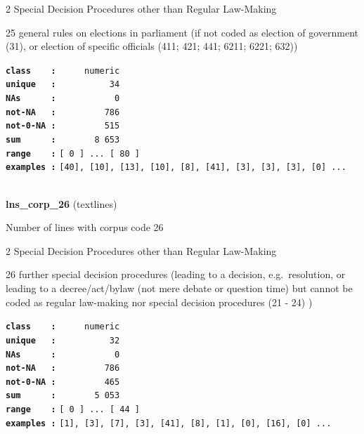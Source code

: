 \documentclass[]{article}
\begin{document}
2 Special Decision Procedures other than Regular Law-Making

25 general rules on elections in parliament (if not coded as election of
government (31), or election of specific officials (411; 421; 441; 6211;
6221; 632))

\textbf{\texttt{class\ \ \ \ :}} \texttt{~~~~~numeric}\\
\textbf{\texttt{unique\ \ \ :}} \texttt{~~~~~~~~~~34}\\
\textbf{\texttt{NAs\ \ \ \ \ \ :}} \texttt{~~~~~~~~~~~0}\\
\textbf{\texttt{not-NA\ \ \ :}} \texttt{~~~~~~~~~786}\\
\textbf{\texttt{not-0-NA\ :}} \texttt{~~~~~~~~~515}\\
\textbf{\texttt{sum\ \ \ \ \ \ :}} \texttt{~~~~~~~8~653}\\
\textbf{\texttt{range\ \ \ \ :}}
\texttt{{[}\ 0\ {]}\ ...\ {[}\ 80\ {]}}\\
\textbf{\texttt{examples\ :}}
\texttt{{[}40{]},\ {[}10{]},\ {[}13{]},\ {[}10{]},\ {[}8{]},\ {[}41{]},\ {[}3{]},\ {[}3{]},\ {[}3{]},\ {[}0{]}\ ...}\\

~

\textbf{lns\_corp\_26} (textlines)

Number of lines with corpus code 26

2 Special Decision Procedures other than Regular Law-Making

26 further special decision procedures (leading to a decision,
e.g.~resolution, or leading to a decree/act/bylaw (not mere debate or
question time) but cannot be coded as regular law-making nor special
decision procedures (21 - 24) )

\textbf{\texttt{class\ \ \ \ :}} \texttt{~~~~~numeric}\\
\textbf{\texttt{unique\ \ \ :}} \texttt{~~~~~~~~~~32}\\
\textbf{\texttt{NAs\ \ \ \ \ \ :}} \texttt{~~~~~~~~~~~0}\\
\textbf{\texttt{not-NA\ \ \ :}} \texttt{~~~~~~~~~786}\\
\textbf{\texttt{not-0-NA\ :}} \texttt{~~~~~~~~~465}\\
\textbf{\texttt{sum\ \ \ \ \ \ :}} \texttt{~~~~~~~5~053}\\
\textbf{\texttt{range\ \ \ \ :}}
\texttt{{[}\ 0\ {]}\ ...\ {[}\ 44\ {]}}\\
\textbf{\texttt{examples\ :}}
\texttt{{[}1{]},\ {[}3{]},\ {[}7{]},\ {[}3{]},\ {[}41{]},\ {[}8{]},\ {[}1{]},\ {[}0{]},\ {[}16{]},\ {[}0{]}\ ...}\\
\end{document}
